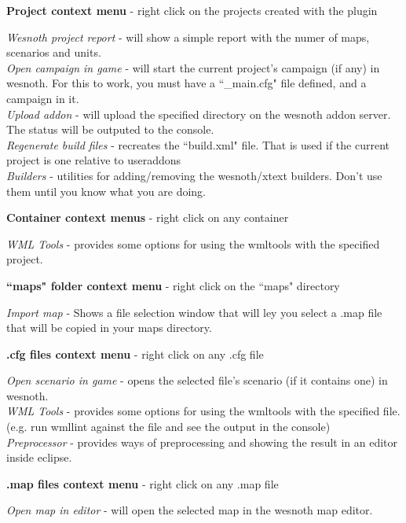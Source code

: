 \documentclass[10pt]{article}
\begin{document}
\begin{description}
\item{\textbf{Project context menu}} - right click on the projects created with the plugin

   \textit{Wesnoth project report} - will show a simple report with the numer of maps, scenarios and units.\\
   \textit{Open campaign in game} - will start the current project's campaign (if any) in wesnoth. For this to work, you must have a ``\_main.cfg" file defined, and a campaign in it.\\
   \textit{Upload addon} - will upload the specified directory on the wesnoth addon server. The status will be outputed to the console.\\
   \textit{Regenerate build files} - recreates the ``build.xml" file. That is used if the current project is one relative to useraddons\\
   \textit{Builders} - utilities for adding/removing the wesnoth/xtext builders. Don't use them until you know what you are doing.

\item{\textbf{Container context menus}} - right click on any container

    \textit{WML Tools} - provides some options for using the wmltools with the specified project.

\item{\textbf{``maps" folder context menu}} - right click on the ``maps" directory

   \textit{Import map} - Shows a file selection window that will ley you select a .map file that will be copied in your maps directory.

\item{\textbf{.cfg files context menu}} - right click on any .cfg file

   \textit{Open scenario in game} - opens the selected file's scenario (if it contains one) in wesnoth.\\
   \textit{WML Tools} - provides some options for using the wmltools with the specified file. (e.g. run wmllint against the file and see the output in the console) \\
   \textit{Preprocessor} - provides ways of preprocessing and showing the result in an editor inside eclipse.

\item{\textbf{.map files context menu}} - right click on any .map file

   \textit{Open map in editor} - will open the selected map in the wesnoth map editor.


\end{description}
\end{document}
